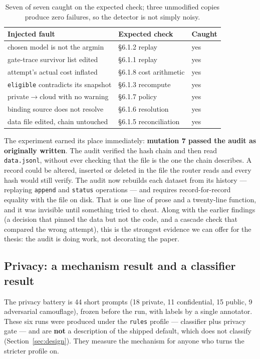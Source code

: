 \documentclass[11pt]{article}
\newcommand{\code}[1]{\texttt{#1}}
\begin{document}
\begin{table}[h]
\centering
\small
\begin{tabular}{@{}p{}p{}p{}@{}}
\toprule
\textbf{Injected fault} & \textbf{Expected check} & \textbf{Caught} \\
\midrule
chosen model is not the argmin          & §6.1.2 replay & yes \\
gate-trace survivor list edited         & §6.1.1 replay & yes \\
attempt's actual cost inflated          & §6.1.8 cost arithmetic & yes \\
\code{eligible} contradicts its snapshot & §6.1.3 recompute & yes \\
private$\rightarrow$cloud with no warning & §6.1.7 policy & yes \\
binding source does not resolve         & §6.1.6 resolution & yes \\
data file edited, chain untouched       & §6.1.5 reconciliation & yes \\
\bottomrule
\end{tabular}
\caption{Seven of seven caught on the expected check; three unmodified copies produce zero
failures, so the detector is not simply noisy.}
\end{table}

The experiment earned its place immediately: \textbf{mutation 7 passed the audit as originally
written}. The audit verified the hash chain and then read \code{data.jsonl}, without ever
checking that the file is the one the chain describes. A record could be altered, inserted or
deleted in the file the router reads and every hash would still verify. The audit now rebuilds
each dataset from its history --- replaying \code{append} and \code{status} operations --- and
requires record-for-record equality with the file on disk. That is one line of prose and a twenty-line
function, and it was invisible until something tried to cheat. Along with the earlier findings
(a decision that pinned the data but not the code, and a cascade check that compared the wrong
attempt), this is the strongest evidence we can offer for the thesis: the audit is doing work,
not decorating the paper.

\subsection{Privacy: a mechanism result and a classifier result}

The privacy battery is 44 short prompts (18 private, 11 confidential, 15 public, 9 adversarial
camouflage), frozen before the run, with labels by a single annotator. These six runs were produced
under the \code{rules} profile --- classifier plus privacy gate --- and are \textbf{not} a description of
the shipped default, which does not classify (Section~\ref{sec:design}). They measure the mechanism
for anyone who turns the stricter profile on.
\end{document}
